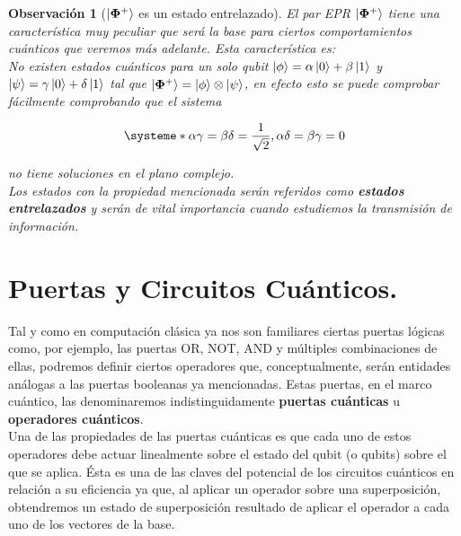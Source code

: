 \documentclass[11pt, spanish]{report}
\numberwithin{equation}{section}
\newtheorem{obs}[defin]{Observación}
\numberwithin{defin}{section}
\begin{document}

\begin{obs}[$\ket{\mathbf{\Phi}^+}$ es un estado entrelazado]
El par EPR $\ket{\mathbf{\Phi}^+}$ tiene una característica muy peculiar que será la base para ciertos comportamientos cuánticos que veremos más adelante. Esta característica es:\\

No existen estados cuánticos para un solo qubit $\ket{\phi}=\alpha\ket{0}+\beta\ket{1}$ y $\ket{\psi}=\gamma\ket{0}+\delta\ket{1}$ tal que $\ket{\mathbf{\Phi}^+}=\ket{\phi}\otimes \ket{\psi}$, en efecto esto se puede comprobar fácilmente comprobando que el sistema
 
\begin{equation}
\systeme*{\alpha\gamma=\beta\delta=\frac{1}{\sqrt{2}},\alpha\delta=\beta\gamma=0}
\end{equation}

no tiene soluciones en el plano complejo.\\

Los estados con la propiedad mencionada serán referidos como \textbf{estados entrelazados} y serán de vital importancia cuando estudiemos la transmisión de información.
\end{obs}

\section{Puertas y Circuitos Cuánticos.}

Tal y como en computación clásica ya nos son familiares ciertas puertas lógicas como, por ejemplo, las puertas OR, NOT, AND y múltiples combinaciones de ellas, podremos definir ciertos operadores que, conceptualmente, serán entidades análogas a las puertas booleanas ya mencionadas. Estas puertas, en el marco cuántico, las denominaremos indistinguidamente \textbf{puertas cuánticas} u \textbf{operadores cuánticos}.   \\

Una de las propiedades de las puertas cuánticas es que cada uno de estos operadores debe actuar linealmente\footnotemark{} sobre el estado del qubit (o qubits) sobre el que se aplica. Ésta es una de las claves del potencial de los circuitos cuánticos en relación a su eficiencia ya que, al aplicar un operador sobre una superposición, obtendremos un estado de superposición resultado de aplicar el operador a cada uno de los vectores de la base.\\
\end{document}
